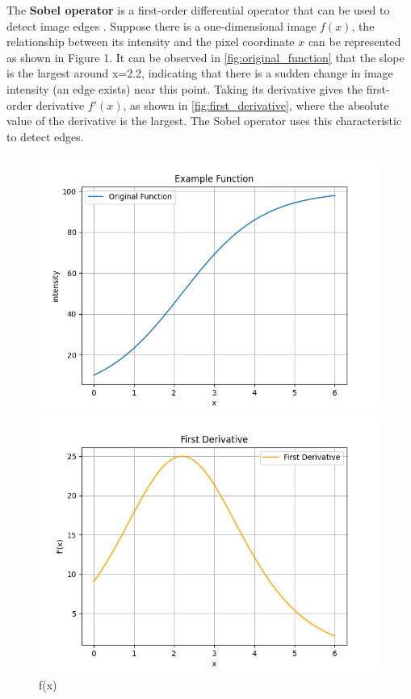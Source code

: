 The \textbf{Sobel operator} is a first-order differential operator that can be used to detect image edges \cite{补充1}. Suppose there is a one-dimensional image $f(x)$, the relationship between its intensity and the pixel coordinate $x$ can be represented as shown in Figure 1. It can be observed in \autoref{fig:original_function} that the slope is the largest around x=2.2, indicating that there is a sudden change in image intensity (an edge exists) near this point. Taking its derivative gives the first-order derivative $f'(x)$, as shown in \autoref{fig:first_derivative}, where the absolute value of the derivative is the largest. The Sobel operator uses this characteristic to detect edges.

\begin{figure}[htbp]
    \centering
    \begin{minipage}[b]{0.32\textwidth}
        \centering
        \includegraphics[width=\textwidth]{./fig/original_function.png}
        \caption{f(x)}
        \label{fig:original_function}
    \end{minipage}
    \begin{minipage}[b]{0.32\textwidth}
        \centering
        \includegraphics[width=\textwidth]{./fig/first_derivative.png}

\end{minipage}
\end{figure}
